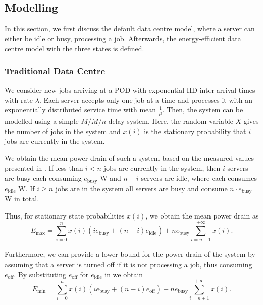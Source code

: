\subsection{Modelling}\label{sec:cloud:data_centers:modeling}
In this section, we first discuss the default data centre model, where a server can either be idle or busy, processing a job. Afterwards, the energy-efficient data centre model with the three states is defined.

\subsubsection*{Traditional Data Centre}\label{sec:cloud:data_centers:modeling:default}
We consider new jobs arriving at a \gls{POD} with exponential \gls{IID} inter-arrival times with rate \(\lambda\).
Each server accepts only one job at a time and processes it with an exponentially distributed service time with mean \(\frac{1}{\mu}\).
Then, the system can be modelled using a simple \(M/M/n\) delay system.
Here, the random variable \(X\) gives the number of jobs in the system and \(x(i)\) is the stationary probability that \(i\) jobs are currently in the system.

We obtain the mean power drain of such a system based on the measured values presented in .
If less than \(i < n\) jobs are currently in the system, then \(i\) servers are busy each consuming \(e_\text{busy}\) \si{\watt} and \(n-i\) servers are idle, where each consumes \(e_\text{idle}\) \si{\watt}.
If \(i \geq n\) jobs are in the system all servers are busy and consume \(n\cdot e_\text{busy}\) \si{\watt} in total.

Thus, for stationary state probabilities \(x(i)\), we obtain the mean power drain as
\begin{equation}\label{sec:cloud:data_centers:modeling:default:emax}
E_\text{max} = \sum_{i=0}^{n} x(i) (i e_\text{busy} + (n-i) e_\text{idle}) + ne_\text{busy} \sum_{i=n + 1}^{+ \infty} x(i).
\end{equation}

Furthermore, we can provide a lower bound for the power drain of the system by assuming that a server is turned off if it is not processing a job, thus consuming \(e_\text{off}\).
By substituting \(e_\text{off}\) for \(e_\text{idle}\) in  we obtain
\begin{equation*}
E_\text{min} = \sum_{i=0}^{n} x(i) (i e_\text{busy} + (n-i) e_\text{off}) + ne_\text{busy} \sum_{i=n + 1}^{+ \infty} x(i).
\end{equation*}

